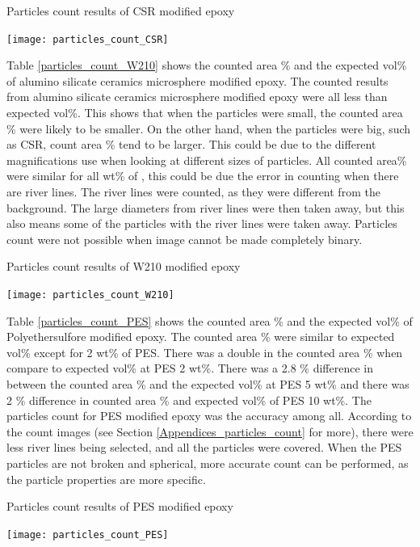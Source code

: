 \documentclass[numbers=noendperiod,chapterprefix=on]{icldt} %
\begin{document}
{\begin{table}[!htpb]
\centering
\caption{Particles count results of CSR modified epoxy} \label{particles_count_CSR}
\texttt{[image: particles\_count\_CSR]}
\end{table}
\FloatBarrier

Table \ref{particles_count_W210} shows the counted area \% and the expected vol\% of alumino silicate ceramics microsphere modified epoxy.
The counted results from alumino silicate ceramics microsphere modified epoxy were all less than expected vol\%. This shows that when the particles were small, the counted area \% were likely to be smaller. On the other hand, when the particles were big, such as CSR, count area \% tend to be larger. This could be due to the different magnifications use when looking at different sizes of particles.
All counted area\% were similar for all wt\% of , this could be due the error in counting when there are river lines.
The river lines were counted, as they were different from the background. The large diameters from river lines were then taken away, but this also means some of the particles with the river lines were taken away. Particles count were not possible when image cannot be made completely binary.

\begin{table}[!htpb]
\centering
\caption{Particles count results of W210 modified epoxy} \label{particles_count_W210}
\texttt{[image: particles\_count\_W210]}
\end{table}
\FloatBarrier

Table \ref{particles_count_PES} shows the counted area \% and the expected vol\% of Polyethersulfore modified epoxy. 
The counted area \% were similar to expected vol\% except for 2 wt\% of PES. 
There was a double in the counted area \% when compare to expected vol\% at PES 2 wt\%. There was a 2.8 \% difference in between the counted area \% and the expected vol\% at PES 5 wt\% and there was 2 \% difference in counted area \% and expected vol\% of PES 10 wt\%.
The particles count for PES modified epoxy was the accuracy among all. According to the count images (see Section  \ref{Appendices_particles_count} for more), there were less river lines being selected, and all the particles were covered. 
When the PES particles are not broken and spherical, more accurate count can be performed, as the particle properties are more specific. 

\begin{table}[!htpb]
\centering
\caption{Particles count results of PES modified epoxy} \label{particles_count_PES}
\texttt{[image: particles\_count\_PES]}
\end{table}
\FloatBarrier

}
\end{document}
